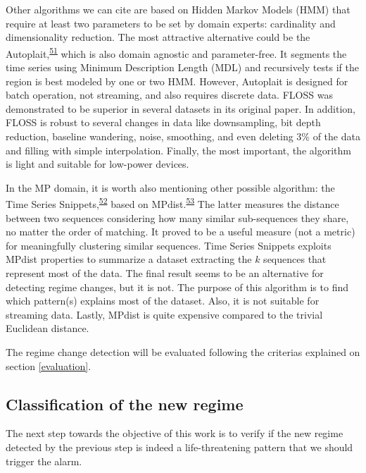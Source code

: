 \documentclass[12pt,twoside]{fmupthesis}
\begin{document}
Other algorithms we can cite are based on Hidden Markov Models (HMM) that require at least two
parameters to be set by domain experts: cardinality and dimensionality reduction. The most
attractive alternative could be the Autoplait,\textsuperscript{\protect\hyperlink{ref-Matsubara2014}{51}} which is also domain agnostic and
parameter-free. It segments the time series using Minimum Description Length (MDL) and recursively
tests if the region is best modeled by one or two HMM. However, Autoplait is designed for batch
operation, not streaming, and also requires discrete data. FLOSS was demonstrated to be superior in
several datasets in its original paper. In addition, FLOSS is robust to several changes in data like
downsampling, bit depth reduction, baseline wandering, noise, smoothing, and even deleting 3\% of the
data and filling with simple interpolation. Finally, the most important, the algorithm is light and
suitable for low-power devices.

In the MP domain, it is worth also mentioning other possible algorithm: the Time Series Snippets,\textsuperscript{\protect\hyperlink{ref-Imani2018}{52}} based on MPdist.\textsuperscript{\protect\hyperlink{ref-gharghabi2018b}{53}} The latter measures the distance between two
sequences considering how many similar sub-sequences they share, no matter the order of matching. It
proved to be a useful measure (not a metric) for meaningfully clustering similar sequences. Time
Series Snippets exploits MPdist properties to summarize a dataset extracting the \(k\) sequences that
represent most of the data. The final result seems to be an alternative for detecting regime
changes, but it is not. The purpose of this algorithm is to find which pattern(s) explains most of
the dataset. Also, it is not suitable for streaming data. Lastly, MPdist is quite expensive compared
to the trivial Euclidean distance.

The regime change detection will be evaluated following the criterias explained on section
\ref{evaluation}.

\hypertarget{classregime}{%
\subsection{Classification of the new regime}\label{classregime}}

The next step towards the objective of this work is to verify if the new regime detected by the
previous step is indeed a life-threatening pattern that we should trigger the alarm.
\end{document}
